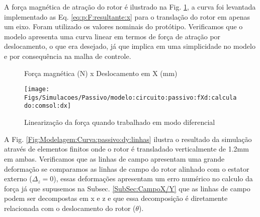 % 


A força magnética de atração do rotor é ilustrado na Fig. \ref{Fig:Modelagem:Curva:passivo:frxd}, a curva foi levantada implementado as Eq. \eqref{eq:p:F:resultante:x} para o translação do rotor em apenas um eixo. Foram utilizado os valores nominais do protótipo. Verificamos que o modelo apresenta uma curva linear em termos de força de atração por deslocamento, o que era desejado, já que implica em uma simplicidade no modelo e por consequência na malha de controle.

\begin{figure}[!ht]
	\centering
	\caption*{Força magnética (N) x Deslocamento em X (mm)}
	\texttt{[image: Figs/Simulacoes/Passivo/modelo:circuito:passivo:fXd:calculado:comsol:dx]}
		\caption{Linearização da força quando trabalhado em modo diferencial}
		\label{Fig:Modelagem:Curva:passivo:frxd}
\end{figure}


A Fig. \ref{Fig:Modelagem:Curva:passivo:dy:linhas} ilustra o resultado da simulação através de elementos finitos onde o rotor é transladado verticalmente de 1.2mm em ambas. Verificamos que as linhas de campo apresentam uma grande deformação se comparamos as linhas de campo do rotor alinhado com o estator externo ($\Delta_z = 0$), essas deformações apresentam um erro numérico no calculo da força já que supusemos na Subsec. \ref{SubSec:CampoX/Y} que as linhas de campo podem ser decompostas em x e z e que essa decomposição é diretamente relacionada com o deslocamento do rotor ($\theta$). 

